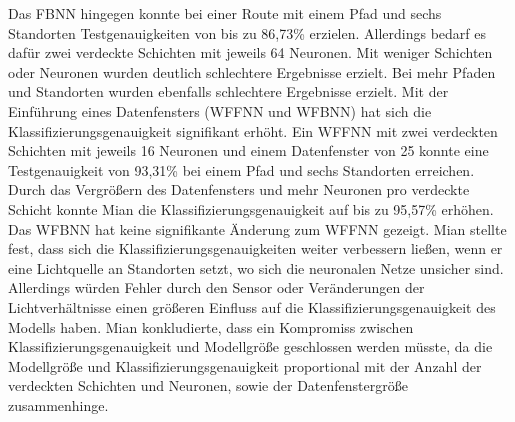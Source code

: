 Das FBNN hingegen konnte bei einer Route mit einem Pfad und sechs Standorten Testgenauigkeiten von bis zu 86,73\% erzielen.
Allerdings bedarf es dafür zwei verdeckte Schichten mit jeweils 64 Neuronen.
Mit weniger Schichten oder Neuronen wurden deutlich schlechtere Ergebnisse erzielt.
Bei mehr Pfaden und Standorten wurden ebenfalls schlechtere Ergebnisse erzielt.
\newline
\newline
Mit der Einführung eines Datenfensters (WFFNN und WFBNN) hat sich die Klassifizierungsgenauigkeit signifikant erhöht.
Ein WFFNN mit zwei verdeckten Schichten mit jeweils 16 Neuronen und einem Datenfenster von 25 konnte eine Testgenauigkeit von 93,31\%
bei einem Pfad und sechs Standorten erreichen.
Durch das Vergrößern des Datenfensters und mehr Neuronen pro verdeckte Schicht konnte Mian die Klassifizierungsgenauigkeit auf bis zu 95,57\% erhöhen.
Das WFBNN hat keine signifikante Änderung zum WFFNN gezeigt.
\newline
\newline
Mian stellte fest, dass sich die Klassifizierungsgenauigkeiten weiter verbessern ließen,
wenn er eine Lichtquelle an Standorten setzt, wo sich die neuronalen Netze unsicher sind.
Allerdings würden Fehler durch den Sensor oder Veränderungen der Lichtverhältnisse
einen größeren Einfluss auf die Klassifizierungsgenauigkeit des Modells haben.
\newline
\newline
Mian konkludierte, dass ein Kompromiss zwischen Klassifizierungsgenauigkeit und Modellgröße geschlossen werden müsste,
da die Modellgröße und Klassifizierungsgenauigkeit proportional mit der Anzahl der verdeckten Schichten und Neuronen,
sowie der Datenfenstergröße zusammenhinge.
